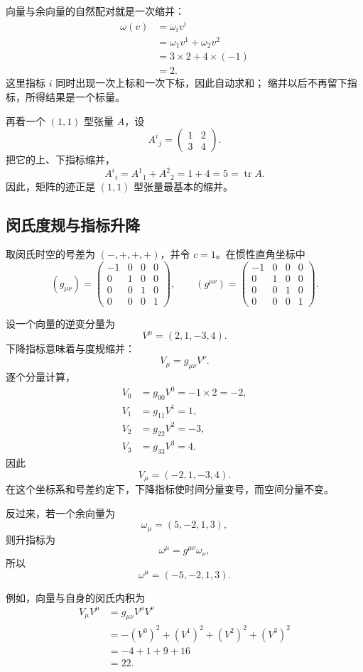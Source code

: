 \documentclass[UTF8,11pt,a4paper,fontset=fandol]{ctexart}
\numberwithin{equation}{section}
\DeclareMathOperator{\tr}{tr}
\begin{document}
向量与余向量的自然配对就是一次缩并：
\[
\begin{aligned}
\omega(v)
&=\omega_i v^i\\
&=\omega_1v^1+\omega_2v^2\\
&=3\times2+4\times(-1)\\
&=2.
\end{aligned}
\]
这里指标 $i$ 同时出现一次上标和一次下标，因此自动求和；
缩并以后不再留下指标，所得结果是一个标量。

再看一个 $(1,1)$ 型张量 $A$，设
\[
A^i{}_j=
\begin{pmatrix}
1&2\\
3&4
\end{pmatrix}.
\]
把它的上、下指标缩并，
\[
A^i{}_i
=A^1{}_1+A^2{}_2
=1+4
=5
=\tr A.
\]
因此，矩阵的迹正是 $(1,1)$ 型张量最基本的缩并。


\subsection{闵氏度规与指标升降}

取闵氏时空的号差为 $(-,+,+,+)$，并令 $c=1$。在惯性直角坐标中
\[
(g_{\mu\nu})
=
\begin{pmatrix}
-1&0&0&0\\
0&1&0&0\\
0&0&1&0\\
0&0&0&1
\end{pmatrix},
\qquad
(g^{\mu\nu})
=
\begin{pmatrix}
-1&0&0&0\\
0&1&0&0\\
0&0&1&0\\
0&0&0&1
\end{pmatrix}.
\]

设一个向量的逆变分量为
\[
V^\mu=(2,1,-3,4).
\]
下降指标意味着与度规缩并：
\[
V_\mu=g_{\mu\nu}V^\nu.
\]
逐个分量计算，
\[
\begin{aligned}
V_0&=g_{00}V^0=-1\times2=-2,\\
V_1&=g_{11}V^1=1,\\
V_2&=g_{22}V^2=-3,\\
V_3&=g_{33}V^3=4.
\end{aligned}
\]
因此
\[
V_\mu=(-2,1,-3,4).
\]
在这个坐标系和号差约定下，下降指标使时间分量变号，而空间分量不变。

反过来，若一个余向量为
\[
\omega_\mu=(5,-2,1,3),
\]
则升指标为
\[
\omega^\mu=g^{\mu\nu}\omega_\nu,
\]
所以
\[
\omega^\mu=(-5,-2,1,3).
\]

例如，向量与自身的闵氏内积为
\[
\begin{aligned}
V_\mu V^\mu
&=g_{\mu\nu}V^\mu V^\nu\\
&=-(V^0)^2+(V^1)^2+(V^2)^2+(V^3)^2\\
&=-4+1+9+16\\
&=22.
\end{aligned}
\]
\end{document}
